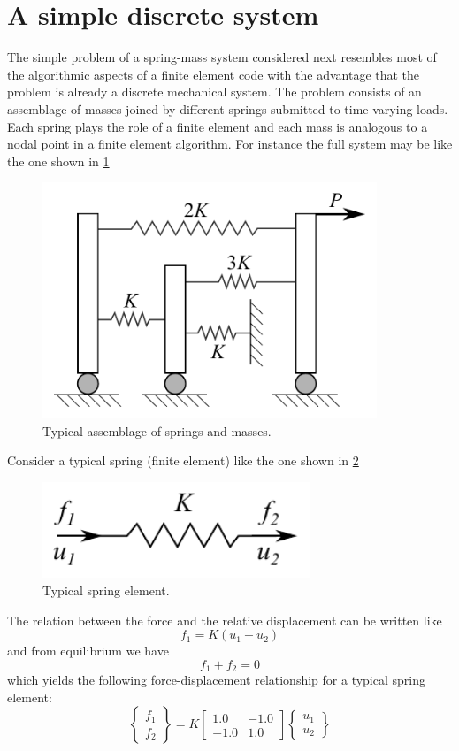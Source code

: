 \section{A simple discrete system}
The simple problem of a spring-mass system considered next resembles most of the algorithmic aspects of a finite element code with the advantage that the problem is already a discrete mechanical system. The problem consists of an assemblage of masses joined by different springs submitted to time varying loads. Each spring plays the role of a finite element and each mass is analogous to a nodal point in a finite element algorithm. For instance the full system may be like the one shown in \cref{fig:bathe}
\begin{figure}[h]
\centering
\includegraphics[width=10cm]{spring_system.pdf}
\caption{Typical assemblage of springs and masses.}
\label{fig:bathe}
\end{figure}


Consider a typical spring (finite element) like the one shown in \cref{fig:springel}
\begin{figure}[h]
\centering
\includegraphics[width=8cm]{springel.pdf}
\caption{Typical spring element.}
\label{fig:springel}
\end{figure}

The relation between the force and the relative displacement can be written like
\[f_1 = K(u_1 - u_2)\]
and from equilibrium we have
\[f_1 + f_2 = 0\]
which yields the following force-displacement relationship for a typical spring element:
\begin{equation}
    \begin{Bmatrix}
        f_1\\
        f_2
    \end{Bmatrix} =
    K\begin{bmatrix}
          1.0 & -1.0\\
        - 1.0 & 1.0
    \end{bmatrix}
    \begin{Bmatrix}
        u_1\\
        u_2
    \end{Bmatrix}
    \label{eq:Kspring}
\end{equation}


